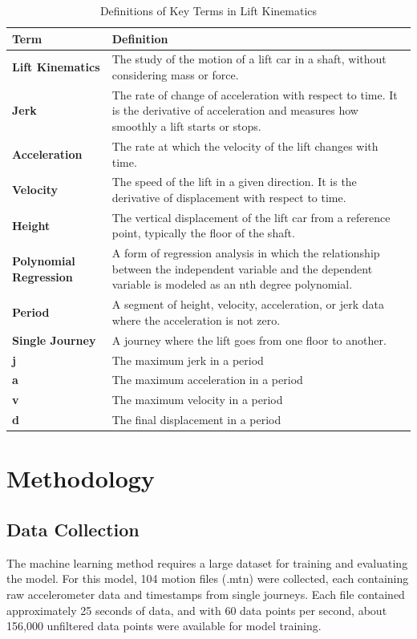 \documentclass[12pt,a4paper]{article}
\begin{document}
\begin{table}[H]
\centering
\begin{tabular}{|p{}|p{}|}
\hline
\textbf{Term} & \textbf{Definition} \\ \hline
\textbf{Lift Kinematics} & The study of the motion of a lift car in a shaft, without considering mass or force. \\ \hline
\textbf{Jerk} & The rate of change of acceleration with respect to time. It is the derivative of acceleration and measures how smoothly a lift starts or stops. \\ \hline
\textbf{Acceleration} & The rate at which the velocity of the lift changes with time. \\ \hline
\textbf{Velocity} & The speed of the lift in a given direction. It is the derivative of displacement with respect to time. \\ \hline
\textbf{Height} & The vertical displacement of the lift car from a reference point, typically the floor of the shaft. \\ \hline
\textbf{Polynomial Regression}& A form of regression analysis in which the relationship between the independent variable and the dependent variable is modeled as an nth degree polynomial. \\ \hline
\textbf{Period} & A segment of height, velocity, acceleration, or jerk data where the acceleration is not zero. \\ \hline
\textbf{Single Journey} & A journey where the lift goes from one floor to another. \\ \hline
 \textbf{j}&The maximum jerk in a period\\\hline
 \textbf{a}&The maximum acceleration in a period\\\hline
 \textbf{v}&The maximum velocity in a period\\\hline
 \textbf{d}&The final displacement in a period\\\hline
\end{tabular}
\caption{Definitions of Key Terms in Lift Kinematics}
\end{table}

\section{Methodology}

\subsection{Data Collection}
The machine learning method requires a large dataset for training and evaluating the model. For this model, 104 motion files (.mtn) were collected, each containing raw accelerometer data and timestamps from single journeys. Each file contained approximately 25 seconds of data, and with 60 data points per second, about 156,000 unfiltered data points were available for model training.
\end{document}
